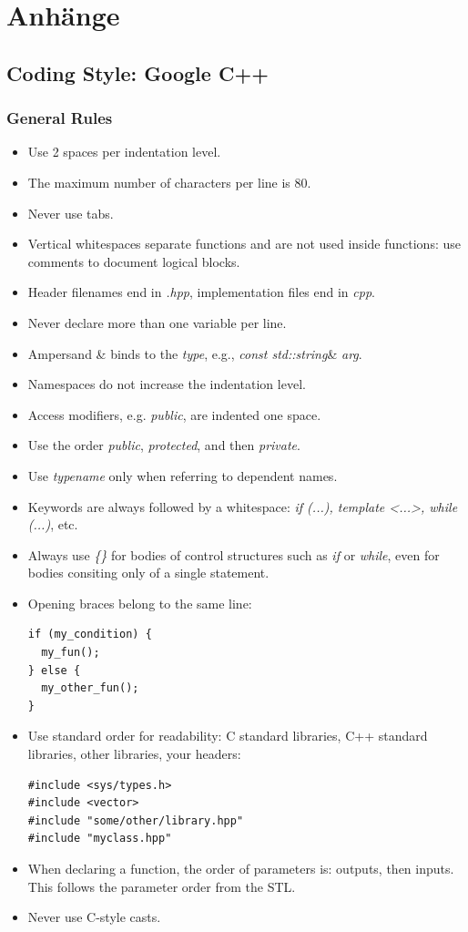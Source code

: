 \documentclass[oneside,a4paper,titlepage]{scrartcl}              %
\begin{document}
\newpage

\section{Anhänge}

\subsection{Coding Style: Google C++}

\subsubsection{General Rules}
\begin{itemize}
  \item Use 2 spaces per indentation level.
  \item The maximum number of characters per line is 80.
  \item Never use tabs.
  \item Vertical whitespaces separate functions and are not used inside functions: use comments to document logical blocks.
  \item Header filenames end in \emph{.hpp}, implementation files end in \emph{cpp}.
  \item Never declare more than one variable per line.
  \item Ampersand {\&} binds to the \emph{type}, e.g., \emph{const std::string}\& \emph{arg}.
  \item Namespaces do not increase the indentation level.
  \item Access modifiers, e.g. \emph{public}, are indented one space.
  \item Use the order \emph{public}, \emph{protected}, and then \emph{private}.
  \item Use \emph{typename} only when referring to dependent names.
  \item Keywords are always followed by a whitespace: \emph{if (...), template \textless...\textgreater, while (...)}, etc.
  \item Always use \emph{\{\}} for bodies of control structures such as \emph{if} or \emph{while}, even for bodies consiting only of a single statement.
  \item Opening braces belong to the same line:
  \begin{lstlisting}
if (my_condition) {
  my_fun();
} else {
  my_other_fun();
}
  \end{lstlisting}
  \item Use standard order for readability: C standard libraries, C++ standard libraries, other libraries, your headers:
  \begin{lstlisting}
#include <sys/types.h>
#include <vector>
#include "some/other/library.hpp"
#include "myclass.hpp"
  \end{lstlisting}
  \item When declaring a function, the order of parameters is: outputs, then inputs. This follows the parameter order from the STL.
  \item Never use C-style casts.
\end{itemize}
\end{document}
